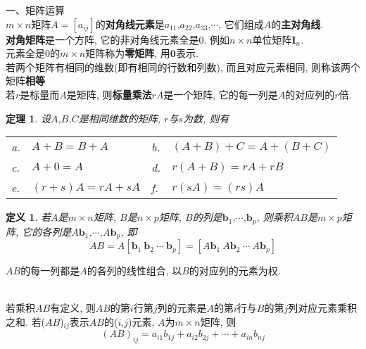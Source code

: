 \documentclass[UTF8,fontset=ubuntu]{ctexart}
\theoremstyle{plain}
\newtheorem{theorem}{定理}
\theoremstyle{nonumberplain}
\newtheorem{definition}{定义}
\theoremstyle{empty}
\begin{document}
一、矩阵运算\\[1ex]
$m\times n$矩阵$A=[a_{ij}]$的\textbf{对角线元素}是$a_{11}$,$a_{22}$,$a_{33}$,$\cdots$, 它们组成$A$的\textbf{主对角线}.\\[1ex]
\textbf{对角矩阵}是一个方阵, 它的非对角线元素全是0. 例如$n\times n$单位矩阵$\bm{I}_n$.\\[1ex]
元素全是0的$m\times n$矩阵称为\textbf{零矩阵}, 用$\bm{0}$表示.\\[1ex]
若两个矩阵有相同的维数(即有相同的行数和列数), 而且对应元素相同, 则称该两个矩阵\textbf{相等}\\[1ex]
若$r$是标量而$A$是矩阵, 则\textbf{标量乘法}$rA$是一个矩阵, 它的每一列是$A$的对应列的$r$倍.\\[2ex]

\begin{theorem}
设$A$,$B$,$C$是相同维数的矩阵, $r$与$s$为数, 则有\\
\begin{tabular}{l@{\ }l@{\hspace{5em}}l@{\ }l}
a. & $A+B=B+A$ & b. & $(A+B)+C=A+(B+C)$\\
c. & $A+0=A$ & d. & $r(A+B)=rA+rB$\\
e. & $(r+s)A=rA+sA$ & f. & $r(sA)=(rs)A$
\end{tabular}
\end{theorem}\vspace{4ex}

\begin{definition}
若$A$是$m\times n$矩阵, $B$是$n\times p$矩阵, $B$的列是$\bm{b}_1$,$\cdots$,$\bm{b}_p$, 则乘积$AB$是$m\times p$矩阵, 它的各列是$A\bm{b}_1$,$\cdots$,$A\bm{b}_p$, 即
\[AB=A[\bm{b}_1\ \bm{b}_2\ \cdots\ \bm{b}_p]=[A\bm{b}_1\ A\bm{b}_2\ \cdots\ A\bm{b}_p]\]
\end{definition}\vspace{4ex}

\begin{law}
$AB$的每一列都是$A$的各列的线性组合, 以$B$的对应列的元素为权.
\end{law}\vspace{4ex}

\begin{law}[计算$AB$的行列法则]\ \\
若乘积$AB$有定义, 则$AB$的第$i$行第$j$列的元素是$A$的第$i$行与$B$的第$j$列对应元素乘积之和. 若($AB$)${}_{ij}$表示$AB$的($i$,$j$)元素, $A$为$m\times n$矩阵, 则
\[(AB)_{ij}=a_{i1}b_{1j}+a_{i2}b_{2j}+\cdots+a_{in}b_{nj}\]
\end{law}\vspace{4ex}
\end{document}
